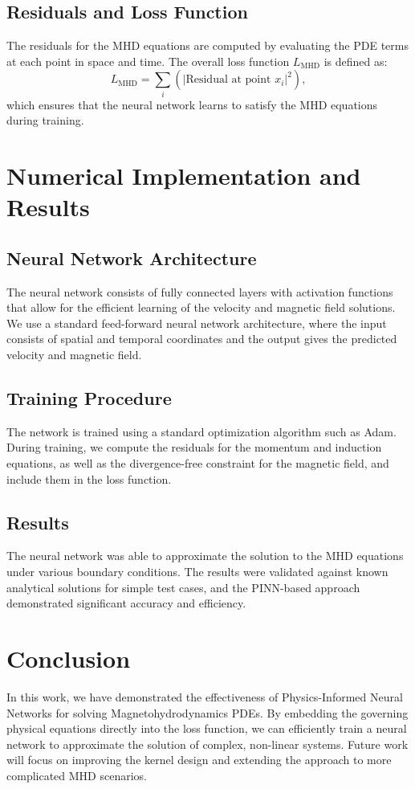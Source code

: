 \documentclass[12pt]{article}
\begin{document}
\subsection{Residuals and Loss Function}
The residuals for the MHD equations are computed by evaluating the PDE terms at each point in space and time. The overall loss function \( L_{\text{MHD}} \) is defined as:
\begin{equation}
L_{\text{MHD}} = \sum_i \left( \left| \text{Residual at point } x_i \right|^2 \right),
\end{equation}
which ensures that the neural network learns to satisfy the MHD equations during training.

\section{Numerical Implementation and Results}
\subsection{Neural Network Architecture}
The neural network consists of fully connected layers with activation functions that allow for the efficient learning of the velocity and magnetic field solutions. We use a standard feed-forward neural network architecture, where the input consists of spatial and temporal coordinates and the output gives the predicted velocity and magnetic field.

\subsection{Training Procedure}
The network is trained using a standard optimization algorithm such as Adam. During training, we compute the residuals for the momentum and induction equations, as well as the divergence-free constraint for the magnetic field, and include them in the loss function.

\subsection{Results}
The neural network was able to approximate the solution to the MHD equations under various boundary conditions. The results were validated against known analytical solutions for simple test cases, and the PINN-based approach demonstrated significant accuracy and efficiency.

\section{Conclusion}
In this work, we have demonstrated the effectiveness of Physics-Informed Neural Networks for solving Magnetohydrodynamics PDEs. By embedding the governing physical equations directly into the loss function, we can efficiently train a neural network to approximate the solution of complex, non-linear systems. Future work will focus on improving the kernel design and extending the approach to more complicated MHD scenarios.
\end{document}

